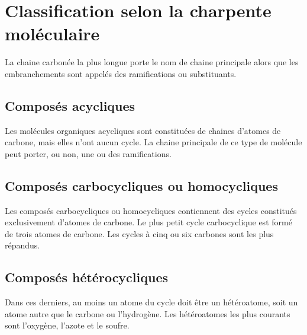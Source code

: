 \section{Classification selon la charpente moléculaire}
La chaine carbonée la plus longue porte le nom de chaine principale alors que les embranchements sont appelés des ramifications ou substituants.
\subsection{Composés acycliques} Les molécules organiques acycliques sont constituées de chaines d'atomes de carbone, mais elles n'ont aucun cycle.
La chaine principale de ce type de molécule peut porter, ou non, une ou des ramifications.
\subsection{Composés carbocycliques ou homocycliques} Les composés carbocycliques ou homocycliques contiennent des cycles constitués exclusivement d'atomes de carbone.
Le plus petit cycle carbocyclique est formé de trois atomes de carbone.
Les cycles à cinq ou six carbones sont les plus répandus.
\subsection{Composés hétérocycliques} Dans ces derniers, au moins un atome du cycle doit être un hétéroatome, soit un atome autre que le carbone ou l'hydrogène.
Les hétéroatomes les plus courants sont l'oxygène, l'azote et le soufre.
